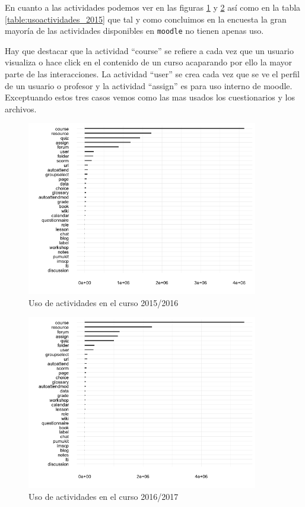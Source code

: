En cuanto a las actividades podemos ver en las figuras \ref{fig:usoactividades_2015} y \ref{fig:usoactividades_2016} así como en la tabla \ref{table:usoactividades_2015} que tal y como concluimos en la encuesta la gran mayoría de las actividades disponibles en \texttt{moodle} no tienen apenas uso.

\bigskip
Hay que destacar que la actividad ``course'' se refiere a cada vez que un usuario visualiza o hace click en el contenido de un curso acaparando por ello la mayor parte de las interacciones. La actividad ``user'' se crea cada vez que se ve el perfil de un usuario o profesor y la actividad ``assign'' es para uso interno de moodle. Exceptuando estos tres casos vemos como las mas usados los cuestionarios y los archivos.

\begin{figure}[H]
\centering
\includegraphics[width=0.9\textwidth]{../r/usoactividades_2015}
\caption{Uso de actividades en el curso 2015/2016}
\label{fig:usoactividades_2015}
\end{figure}

\begin{figure}[H]
\centering
\includegraphics[width=0.9\textwidth]{../r/usoactividades_2016}
\caption{Uso de actividades en el curso 2016/2017}
\label{fig:usoactividades_2016}
\end{figure}

